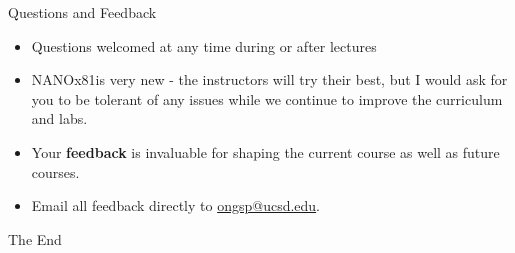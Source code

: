 \documentclass[aspectratio=169]{beamer}
\newcommand{\classname}{NANOx81}
\begin{document}
\begin{frame}{Questions and Feedback}
    \begin{itemize}
        \item Questions welcomed at any time during or after lectures
        \item \classname is very new - the instructors will try their best, but I would ask for you to be tolerant of any issues while we continue to improve the curriculum and labs.
        \item Your \textbf{feedback} is invaluable for shaping the current course as well as future courses. 
        \item Email all feedback directly to \href{mailto:ongsp@eng.ucsd.edu}{ongsp@ucsd.edu}.
    \end{itemize}
\end{frame}


\begin{frame}
    \Huge{\centerline{The End}}
\end{frame}
\end{document}
